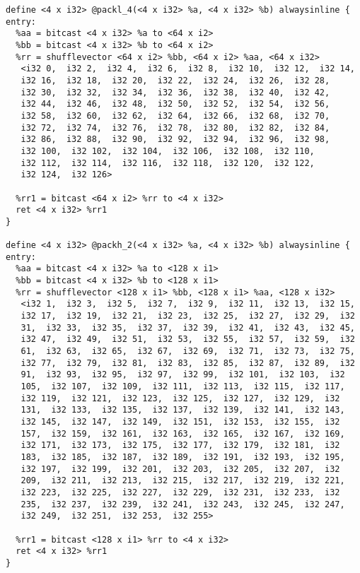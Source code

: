 \begin{lstlisting}
define <4 x i32> @packl_4(<4 x i32> %a, <4 x i32> %b) alwaysinline {
entry:
  %aa = bitcast <4 x i32> %a to <64 x i2>
  %bb = bitcast <4 x i32> %b to <64 x i2>
  %rr = shufflevector <64 x i2> %bb, <64 x i2> %aa, <64 x i32>
   <i32 0,  i32 2,  i32 4,  i32 6,  i32 8,  i32 10,  i32 12,  i32 14,
   i32 16,  i32 18,  i32 20,  i32 22,  i32 24,  i32 26,  i32 28,
   i32 30,  i32 32,  i32 34,  i32 36,  i32 38,  i32 40,  i32 42,
   i32 44,  i32 46,  i32 48,  i32 50,  i32 52,  i32 54,  i32 56,
   i32 58,  i32 60,  i32 62,  i32 64,  i32 66,  i32 68,  i32 70,
   i32 72,  i32 74,  i32 76,  i32 78,  i32 80,  i32 82,  i32 84,
   i32 86,  i32 88,  i32 90,  i32 92,  i32 94,  i32 96,  i32 98,
   i32 100,  i32 102,  i32 104,  i32 106,  i32 108,  i32 110,
   i32 112,  i32 114,  i32 116,  i32 118,  i32 120,  i32 122,
   i32 124,  i32 126>

  %rr1 = bitcast <64 x i2> %rr to <4 x i32>
  ret <4 x i32> %rr1
}

define <4 x i32> @packh_2(<4 x i32> %a, <4 x i32> %b) alwaysinline {
entry:
  %aa = bitcast <4 x i32> %a to <128 x i1>
  %bb = bitcast <4 x i32> %b to <128 x i1>
  %rr = shufflevector <128 x i1> %bb, <128 x i1> %aa, <128 x i32>
   <i32 1,  i32 3,  i32 5,  i32 7,  i32 9,  i32 11,  i32 13,  i32 15,
   i32 17,  i32 19,  i32 21,  i32 23,  i32 25,  i32 27,  i32 29,  i32
   31,  i32 33,  i32 35,  i32 37,  i32 39,  i32 41,  i32 43,  i32 45,
   i32 47,  i32 49,  i32 51,  i32 53,  i32 55,  i32 57,  i32 59,  i32
   61,  i32 63,  i32 65,  i32 67,  i32 69,  i32 71,  i32 73,  i32 75,
   i32 77,  i32 79,  i32 81,  i32 83,  i32 85,  i32 87,  i32 89,  i32
   91,  i32 93,  i32 95,  i32 97,  i32 99,  i32 101,  i32 103,  i32
   105,  i32 107,  i32 109,  i32 111,  i32 113,  i32 115,  i32 117,
   i32 119,  i32 121,  i32 123,  i32 125,  i32 127,  i32 129,  i32
   131,  i32 133,  i32 135,  i32 137,  i32 139,  i32 141,  i32 143,
   i32 145,  i32 147,  i32 149,  i32 151,  i32 153,  i32 155,  i32
   157,  i32 159,  i32 161,  i32 163,  i32 165,  i32 167,  i32 169,
   i32 171,  i32 173,  i32 175,  i32 177,  i32 179,  i32 181,  i32
   183,  i32 185,  i32 187,  i32 189,  i32 191,  i32 193,  i32 195,
   i32 197,  i32 199,  i32 201,  i32 203,  i32 205,  i32 207,  i32
   209,  i32 211,  i32 213,  i32 215,  i32 217,  i32 219,  i32 221,
   i32 223,  i32 225,  i32 227,  i32 229,  i32 231,  i32 233,  i32
   235,  i32 237,  i32 239,  i32 241,  i32 243,  i32 245,  i32 247,
   i32 249,  i32 251,  i32 253,  i32 255>

  %rr1 = bitcast <128 x i1> %rr to <4 x i32>
  ret <4 x i32> %rr1
}


\end{lstlisting}
